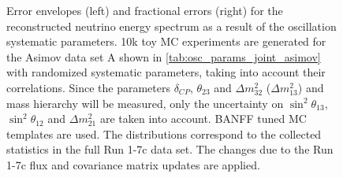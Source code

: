 \begin{figure}[htb]
\caption {
Error envelopes (left) and fractional errors (right) for the reconstructed neutrino energy spectrum
as a result of the oscillation systematic parameters.
10k toy MC experiments are generated for the Asimov data set A shown in \cref{tab:osc_params_joint_asimov}
with randomized systematic parameters, taking into account their correlations.
Since the parameters $\delta_{CP}$, $\theta_{23}$ and $\Delta m^2_{32}$ ($\Delta m^2_{13}$) and mass hierarchy
will be measured,
only the uncertainty on 
$\sin^2 \theta_{13}$,
$\sin^2 \theta_{12}$
and 
$\Delta m^2_{21}$ 
are taken into account.
BANFF tuned MC templates are used. 
The distributions correspond to the collected statistics in the full Run 1-7c data set.
The changes due to the Run 1-7c flux and covariance matrix updates are applied.
}
\label{fig:Osc_envelope_Asimov_A_run17c}
\end{figure}


